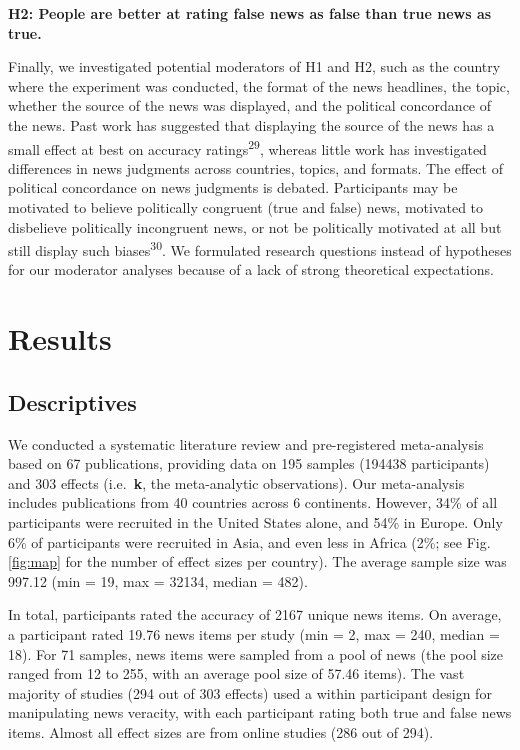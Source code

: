 \documentclass[
  doc,floatsintext]{apa6}
\begin{document}
\textbf{H2: People are better at rating false news as false than true news as true.}

Finally, we investigated potential moderators of H1 and H2, such as the country where the experiment was conducted, the format of the news headlines, the topic, whether the source of the news was displayed, and the political concordance of the news. Past work has suggested that displaying the source of the news has a small effect at best on accuracy ratings\textsuperscript{29}, whereas little work has investigated differences in news judgments across countries, topics, and formats. The effect of political concordance on news judgments is debated. Participants may be motivated to believe politically congruent (true and false) news, motivated to disbelieve politically incongruent news, or not be politically motivated at all but still display such biases\textsuperscript{30}. We formulated research questions instead of hypotheses for our moderator analyses because of a lack of strong theoretical expectations.

\section{Results}\label{results}

\subsection{Descriptives}\label{descriptives}

We conducted a systematic literature review and pre-registered meta-analysis based on 67 publications, providing data on 195 samples (194438 participants) and 303 effects (i.e.~\textbf{k}, the meta-analytic observations). Our meta-analysis includes publications from 40 countries across 6 continents. However, 34\% of all participants were recruited in the United States alone, and 54\% in Europe. Only 6\% of participants were recruited in Asia, and even less in Africa (2\%; see Fig. \ref{fig:map} for the number of effect sizes per country). The average sample size was 997.12 (min = 19, max = 32134, median = 482).

In total, participants rated the accuracy of 2167 unique news items. On average, a participant rated 19.76 news items per study (min = 2, max = 240, median = 18). For 71 samples, news items were sampled from a pool of news (the pool size ranged from 12 to 255, with an average pool size of 57.46 items). The vast majority of studies (294 out of 303 effects) used a within participant design for manipulating news veracity, with each participant rating both true and false news items. Almost all effect sizes are from online studies (286 out of 294).
\end{document}
